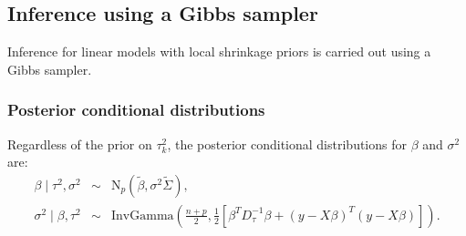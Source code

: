 \documentclass[nojss]{jss}
\begin{document}
\subsection{Inference using a Gibbs sampler}

Inference for linear models with local shrinkage priors is carried out
using a Gibbs sampler.

\subsubsection{Posterior conditional distributions}

Regardless of the prior on $\tau^{2}_k$, the posterior conditional distributions
for $\beta$ and $\sigma^2$ are:
\begin{eqnarray*}
		\beta\mid \tau^2, \sigma^2 &\sim& \mathrm{N}_p\left(\tilde{\beta} , \sigma^2 \tilde{\Sigma} \right),\\
	\sigma^2\mid \beta, \tau^2 &\sim& \mathrm{InvGamma} \left( \frac{n+p}{2}, \frac{1}{2} \left[ \beta^T D_{\tau}^{-1} \beta + \left( y-X\beta\right)^T \left( y-X\beta\right) \right] \right).
\end{eqnarray*}
\end{document}
